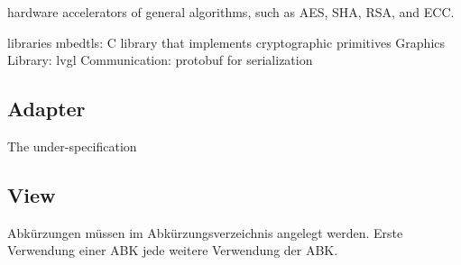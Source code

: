 hardware accelerators of general algorithms, such as AES, SHA, RSA, and ECC. \cite[2]{esp32-ds}


libraries
mbedtls: C library that implements cryptographic primitives
Graphics Library: lvgl
Communication: protobuf for serialization





\subsection{Adapter}
The under-specification 

\subsection{View}





Abkürzungen müssen im Abkürzungsverzeichnis angelegt werden.
Erste Verwendung einer \ac{ABK} jede weitere Verwendung der \ac{ABK}.

\nocite{*}

